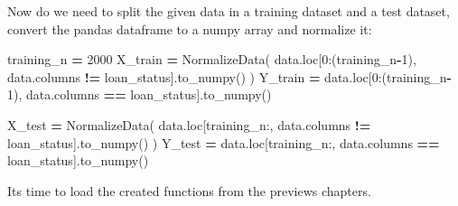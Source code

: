 \documentclass[
]{book}
\newenvironment{Shaded}{\begin{snugshade}}{\end{snugshade}}
\newcommand{\DecValTok}[1]{\textcolor[rgb]{0.00,0.00,0.81}{#1}}
\newcommand{\NormalTok}[1]{#1}
\newcommand{\OperatorTok}[1]{\textcolor[rgb]{0.81,0.36,0.00}{\textbf{#1}}}
\newcommand{\StringTok}[1]{\textcolor[rgb]{0.31,0.60,0.02}{#1}}
\begin{document}
Now do we need to split the given data in a training dataset and a test dataset, convert the pandas dataframe to a numpy array and normalize it:

\begin{Shaded}
\begin{Highlighting}[]
\NormalTok{training\_n }\OperatorTok{=} \DecValTok{2000}
\NormalTok{X\_train }\OperatorTok{=}\NormalTok{ NormalizeData( data.loc[}\DecValTok{0}\NormalTok{:(training\_n}\OperatorTok{{-}}\DecValTok{1}\NormalTok{), data.columns }\OperatorTok{!=} \StringTok{\textquotesingle{}loan\_status\textquotesingle{}}\NormalTok{].to\_numpy() )}
\NormalTok{Y\_train }\OperatorTok{=}\NormalTok{ data.loc[}\DecValTok{0}\NormalTok{:(training\_n}\OperatorTok{{-}}\DecValTok{1}\NormalTok{), data.columns }\OperatorTok{==} \StringTok{\textquotesingle{}loan\_status\textquotesingle{}}\NormalTok{].to\_numpy()}

\NormalTok{X\_test }\OperatorTok{=}\NormalTok{ NormalizeData( data.loc[training\_n:, data.columns }\OperatorTok{!=} \StringTok{\textquotesingle{}loan\_status\textquotesingle{}}\NormalTok{].to\_numpy() )}
\NormalTok{Y\_test }\OperatorTok{=}\NormalTok{ data.loc[training\_n:, data.columns }\OperatorTok{==} \StringTok{\textquotesingle{}loan\_status\textquotesingle{}}\NormalTok{].to\_numpy()}
\end{Highlighting}
\end{Shaded}

Its time to load the created functions from the previews chapters.
\end{document}
